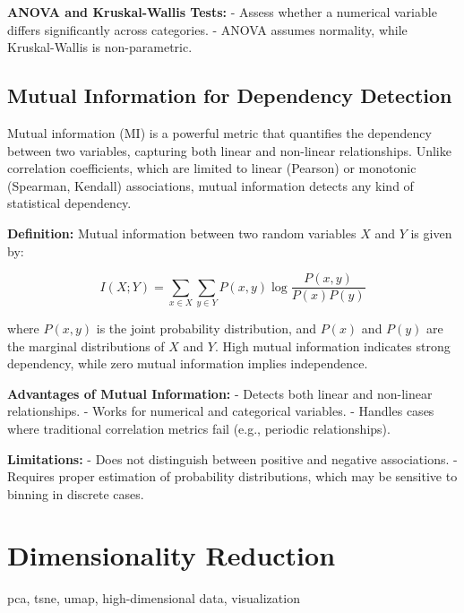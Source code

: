 \documentclass[12pt,openany, draft]{book}
\begin{document}
\textbf{ANOVA and Kruskal-Wallis Tests:}
- Assess whether a numerical variable differs significantly across categories.
- ANOVA assumes normality, while Kruskal-Wallis is non-parametric.
\newline

\subsection{Mutual Information for Dependency Detection}

Mutual information (MI) is a powerful metric that quantifies the dependency between two variables, capturing both linear and non-linear relationships. Unlike correlation coefficients, which are limited to linear (Pearson) or monotonic (Spearman, Kendall) associations, mutual information detects any kind of statistical dependency.
\newline

\textbf{Definition:}
Mutual information between two random variables \( X \) and \( Y \) is given by:

\[
I(X; Y) = \sum_{x \in X} \sum_{y \in Y} P(x, y) \log \frac{P(x, y)}{P(x) P(y)}
\]

where \( P(x, y) \) is the joint probability distribution, and \( P(x) \) and \( P(y) \) are the marginal distributions of \( X \) and \( Y \). High mutual information indicates strong dependency, while zero mutual information implies independence.
\newline

\textbf{Advantages of Mutual Information:}
- Detects both linear and non-linear relationships.
- Works for numerical and categorical variables.
- Handles cases where traditional correlation metrics fail (e.g., periodic relationships).
\newline

\textbf{Limitations:}
- Does not distinguish between positive and negative associations.
- Requires proper estimation of probability distributions, which may be sensitive to binning in discrete cases.
\newline




\section{Dimensionality Reduction}

\begin{keywordsbox}
pca, tsne, umap, high-dimensional data, visualization
\end{keywordsbox}
\end{document}
